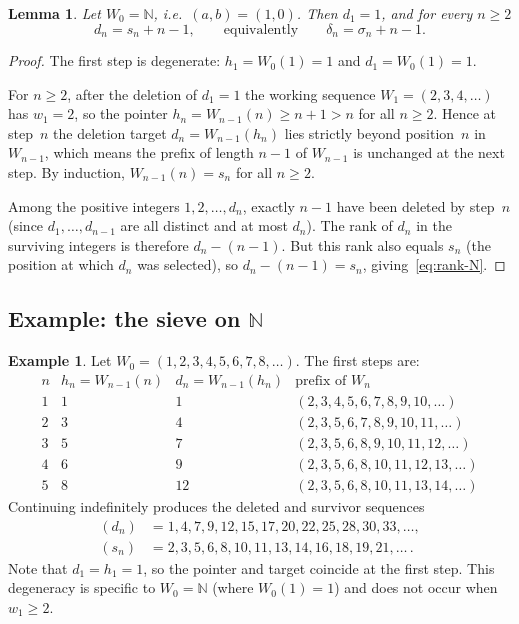 \documentclass[11pt]{article}
\numberwithin{equation}{section}
\theoremstyle{plain}
\newtheorem{lemma}[theorem]{Lemma}
\theoremstyle{definition}
\newtheorem{example}[theorem]{Example}
\theoremstyle{remark}
\newcommand{\N}{\mathbb{N}}
\begin{document}
\begin{lemma}\label{lem:rank-N}
Let $W_0=\N$, i.e.\ $(a,b)=(1,0)$.  Then $d_1=1$, and for every $n\ge2$
\begin{equation}\label{eq:rank-N}
  d_n = s_n + n - 1,
  \qquad\text{equivalently}\qquad
  \delta_n = \sigma_n + n - 1.
\end{equation}
\end{lemma}

\begin{proof}
The first step is degenerate: $h_1=W_0(1)=1$ and $d_1=W_0(1)=1$.

For $n\ge2$, after the deletion of $d_1=1$ the working sequence $W_1=(2,3,4,\ldots)$
has $w_1=2$, so the pointer $h_n=W_{n-1}(n)\ge n+1>n$ for all $n\ge2$.
Hence at step~$n$ the deletion target $d_n=W_{n-1}(h_n)$ lies strictly beyond
position~$n$ in $W_{n-1}$, which means the prefix of length $n-1$ of $W_{n-1}$
is unchanged at the next step.  By induction, $W_{n-1}(n)=s_n$ for all $n\ge2$.

Among the positive integers $1,2,\ldots,d_n$, exactly $n-1$ have been deleted
by step~$n$ (since $d_1,\ldots,d_{n-1}$ are all distinct and at most $d_n$).
The rank of $d_n$ in the surviving integers is therefore $d_n-(n-1)$.
But this rank also equals $s_n$ (the position at which $d_n$ was selected),
so $d_n-(n-1)=s_n$, giving~\eqref{eq:rank-N}.
\end{proof}

\subsection{Example: the sieve on \texorpdfstring{$\N$}{N}}

\begin{example}\label{ex:sieve-N}
Let $W_0=(1,2,3,4,5,6,7,8,\ldots)$. The first steps are:
\[
\begin{array}{c|c|c|l}
n & h_n=W_{n-1}(n) & d_n=W_{n-1}(h_n) & \text{prefix of }W_n \\ \hline
1 & 1 & 1 & (2,3,4,5,6,7,8,9,10,\ldots) \\
2 & 3 & 4 & (2,3,5,6,7,8,9,10,11,\ldots) \\
3 & 5 & 7 & (2,3,5,6,8,9,10,11,12,\ldots) \\
4 & 6 & 9 & (2,3,5,6,8,10,11,12,13,\ldots) \\
5 & 8 & 12 & (2,3,5,6,8,10,11,13,14,\ldots)
\end{array}
\]
Continuing indefinitely produces the deleted and survivor sequences
\begin{align*}
(d_n) &= 1,4,7,9,12,15,17,20,22,25,28,30,33,\ldots,\\
(s_n) &= 2,3,5,6,8,10,11,13,14,16,18,19,21,\ldots\,.
\end{align*}
Note that $d_1 = h_1 = 1$, so the pointer and target coincide at the
first step.  This degeneracy is specific to $W_0=\N$
(where $W_0(1)=1$) and does not occur when $w_1\ge2$.
\end{example}
\end{document}
